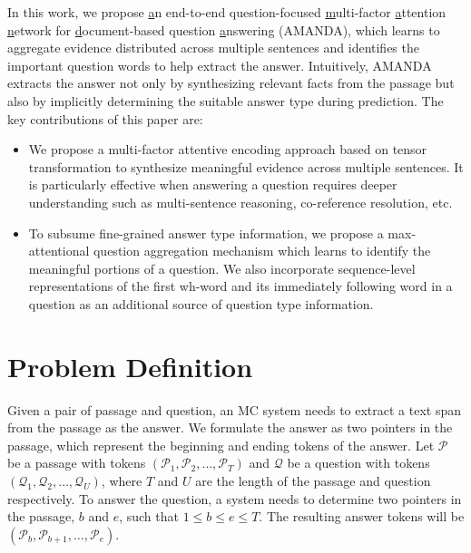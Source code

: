 \documentclass[letterpaper]{article} %
\begin{document}
In this work, we propose \underline{a}n end-to-end question-focused \underline{m}ulti-factor \underline{a}ttention \underline{n}etwork for \underline{d}ocument-based question \underline{a}nswering (AMANDA), which learns to aggregate evidence distributed across multiple sentences and identifies the important question words to help extract the answer.
Intuitively, AMANDA extracts the answer not only by synthesizing relevant facts from the passage but also by implicitly determining the suitable answer type during prediction.
The key contributions of this paper are:
\begin{itemize}
\item We propose a multi-factor attentive encoding approach based on tensor transformation to synthesize meaningful evidence across multiple sentences. It is particularly effective when answering a question requires deeper understanding such as multi-sentence reasoning, co-reference resolution, etc.
\item To subsume fine-grained answer type information, we propose a max-attentional question aggregation mechanism which learns to identify the meaningful portions of a question. We also incorporate sequence-level representations of the first wh-word and its immediately following word in a question as an additional source of question type information.


\end{itemize}
\section{Problem Definition}
\label{sec:prob_def}
Given a pair of passage and question, an MC system needs to extract a text span from the passage as the answer. We formulate the answer as two pointers in the passage, which represent the beginning and ending tokens of the answer. Let $\mathcal{P}$ be a passage with tokens $(\mathcal{P}_1, \mathcal{P}_2, \ldots, \mathcal{P}_T)$ and $\mathcal{Q}$ be a question with tokens $(\mathcal{Q}_1,\mathcal{Q}_2, \ldots, \mathcal{Q}_U)$, where $T$ and $U$ are the length of the passage and question respectively. To answer the question, a system needs to determine two pointers in the passage, $b$ and $e$, such that $1 \leq b \leq e \leq T$. The resulting answer tokens will be $(\mathcal{P}_b, \mathcal{P}_{b+1}, \ldots, \mathcal{P}_e)$.
\end{document}
